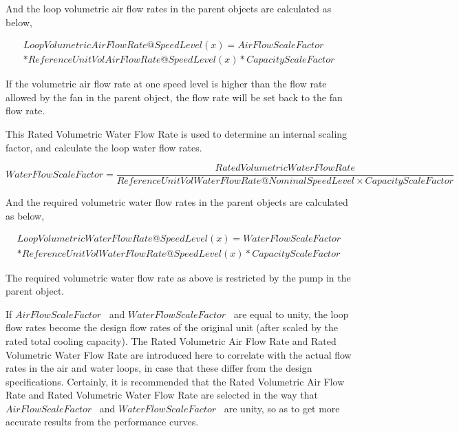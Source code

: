 And the loop volumetric air flow rates in the parent objects are calculated as below,

\begin{equation}
\begin{split}
  LoopVolumetricAirFlowRate@SpeedLevel\left( x \right) = AirFlowScaleFactor \\
  * ReferenceUnitVolAirFlowRate@SpeedLevel(x) * CapacityScaleFactor
\end{split}
\end{equation}

If the volumetric air flow rate at one speed level is higher than the flow rate allowed by the fan in the parent object, the flow rate will be set back to the fan flow rate.

This Rated Volumetric Water Flow Rate is used to determine an internal scaling factor, and calculate the loop water flow rates.

{\scriptsize
\begin{equation}
  WaterFlowScaleFactor = \frac{{RatedVolumetricWaterFlowRate}}{{ReferenceUnitVolWaterFlowRate@NominalSpeedLevel \times CapacityScaleFactor}}
\end{equation}}

And the required volumetric water flow rates in the parent objects are calculated as below,

\begin{equation}
\begin{split}
  LoopVolumetricWaterFlowRate@SpeedLevel\left( x \right) = WaterFlowScaleFactor \\
  * ReferenceUnitVolWaterFlowRate@SpeedLevel(x) * CapacityScaleFactor
\end{split}
\end{equation}

The required volumetric water flow rate as above is restricted by the pump in the parent object.

If \(AirFlowScaleFactor\) ~and \(WaterFlowScaleFactor\) ~are equal to unity, the loop flow rates become the design flow rates of the original unit (after scaled by the rated total cooling capacity). The Rated Volumetric Air Flow Rate and Rated Volumetric Water Flow Rate are introduced here to correlate with the actual flow rates in the air and water loops, in case that these differ from the design specifications. Certainly, it is recommended that the Rated Volumetric Air Flow Rate and Rated Volumetric Water Flow Rate are selected in the way that \(AirFlowScaleFactor\) ~and \(WaterFlowScaleFactor\) ~are unity, so as to get more accurate results from the performance curves.


